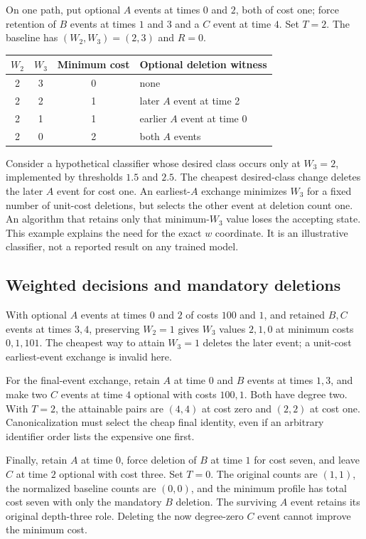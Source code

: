 \documentclass[11pt]{article}
\theoremstyle{remark}
\begin{document}
On one path, put optional $A$ events at times $0$ and $2$, both of cost one;
force retention of $B$ events at times $1$ and $3$ and a $C$ event at time $4$.
Set $T=2$. The baseline has $(W_2,W_3)=(2,3)$ and $R=0$.

\begin{center}
\begin{tabular}{cccl}
\toprule
$W_2$ & $W_3$ & Minimum cost & Optional deletion witness\\
\midrule
2 & 3 & 0 & none\\
2 & 2 & 1 & later $A$ event at time 2\\
2 & 1 & 1 & earlier $A$ event at time 0\\
2 & 0 & 2 & both $A$ events\\
\bottomrule
\end{tabular}
\end{center}

Consider a hypothetical classifier whose desired class occurs only at
$W_3=2$, implemented by thresholds $1.5$ and $2.5$. The cheapest desired-class
change deletes the later $A$ event for cost one. An earliest-$A$ exchange
minimizes $W_3$ for a fixed number of unit-cost deletions, but selects the
other event at deletion count one. An algorithm that retains only that
minimum-$W_3$ value loses the accepting state. This example explains the
need for the exact $w$ coordinate. It is an illustrative classifier, not a
reported result on any trained model.

\subsection{Weighted decisions and mandatory deletions}

With optional $A$ events at times $0$ and $2$ of costs $100$ and $1$, and
retained $B,C$ events at times $3,4$, preserving $W_2=1$ gives $W_3$ values
$2,1,0$ at minimum costs $0,1,101$. The cheapest way to attain $W_3=1$
deletes the later event; a unit-cost earliest-event exchange is invalid here.

For the final-event exchange, retain $A$ at time $0$ and $B$ events at times
$1,3$, and make two $C$ events at time $4$ optional with costs $100,1$.
Both have degree two. With $T=2$, the attainable pairs are $(4,4)$ at cost
zero and $(2,2)$ at cost one. Canonicalization must select the cheap final
identity, even if an arbitrary identifier order lists the expensive one first.

Finally, retain $A$ at time $0$, force deletion of $B$ at time $1$ for cost
seven, and leave $C$ at time $2$ optional with cost three. Set $T=0$. The original counts
are $(1,1)$, the normalized baseline counts are $(0,0)$, and the minimum
profile has total cost seven with only the mandatory $B$ deletion. The
surviving $A$ event retains its original depth-three role. Deleting the now
degree-zero $C$ event cannot improve the minimum cost.
\end{document}
